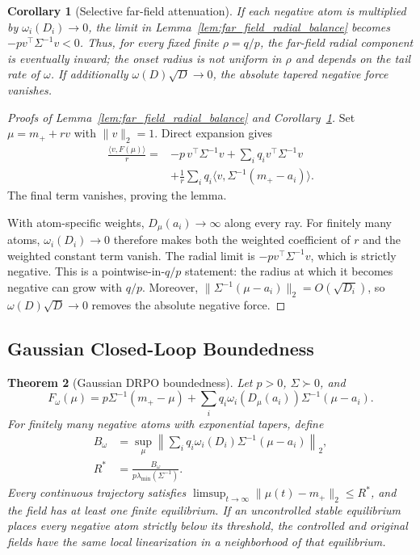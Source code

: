 \documentclass{article}
\theoremstyle{plain}
\newtheorem{theorem}{Theorem}[section]
\newtheorem{corollary}[theorem]{Corollary}
\theoremstyle{definition}
\theoremstyle{remark}
\begin{document}
\begin{corollary}[Selective far-field attenuation]
\label{cor:selective_far_field}
If each negative atom is multiplied by
\(\omega_i(D_i)\to0\), the limit in
Lemma~\ref{lem:far_field_radial_balance} becomes
\(-p v^\top\Sigma^{-1}v<0\).
Thus, for every fixed finite \(\rho=q/p\), the far-field radial component
is eventually inward; the onset radius is not uniform in \(\rho\) and
depends on the tail rate of \(\omega\).
If additionally \(\omega(D)\sqrt D\to0\), the absolute tapered negative
force vanishes.
\end{corollary}

\begin{proof}[Proofs of Lemma~\ref{lem:far_field_radial_balance} and
Corollary~\ref{cor:selective_far_field}]
Set \(\mu=m_++rv\) with \(\|v\|_2=1\). Direct expansion gives
\begin{align}
\frac{\langle v,F(\mu)\rangle}{r}
={}&-p\,v^\top\Sigma^{-1}v
+\sum_iq_i v^\top\Sigma^{-1}v \\
&+\frac1r\sum_iq_i
\langle v,\Sigma^{-1}(m_+-a_i)\rangle.
\end{align}
The final term vanishes, proving the lemma.

With atom-specific weights, \(D_\mu(a_i)\to\infty\) along every ray.
For finitely many atoms, \(\omega_i(D_i)\to0\) therefore makes both the
weighted coefficient of \(r\) and the weighted constant term vanish.
The radial limit is
\(-p v^\top\Sigma^{-1}v\), which is strictly negative. This is a
pointwise-in-\(q/p\) statement: the radius at which it becomes negative
can grow with \(q/p\). Moreover,
\(\|\Sigma^{-1}(\mu-a_i)\|_2=O(\sqrt{D_i})\), so
\(\omega(D)\sqrt D\to0\) removes the absolute negative force.
\end{proof}

\subsection{Gaussian Closed-Loop Boundedness}
\label{app:gaussian_drpo_boundedness}

\begin{theorem}[Gaussian DRPO boundedness]
\label{thm:gaussian_drpo_boundedness}
Let \(p>0\), \(\Sigma\succ0\), and
\[
F_\omega(\mu)=p\Sigma^{-1}(m_+-\mu)
+\sum_iq_i\omega_i(D_\mu(a_i))\Sigma^{-1}(\mu-a_i).
\]
For finitely many negative atoms with exponential tapers, define
\begin{equation}
\begin{aligned}
B_\omega&=\sup_\mu\left\|\sum_iq_i\omega_i(D_i)
\Sigma^{-1}(\mu-a_i)\right\|_2,\\
R^*&=\frac{B_\omega}{p\lambda_{\min}(\Sigma^{-1})}.
\end{aligned}
\label{eq:gaussian_bound_radius}
\end{equation}
Every continuous trajectory satisfies
\(\limsup_{t\to\infty}\|\mu(t)-m_+\|_2\le R^*\), and the field has at
least one finite equilibrium. If an uncontrolled stable equilibrium
places every negative atom strictly below its threshold, the controlled
and original fields have the same local linearization in a neighborhood of
that equilibrium.
\end{theorem}
\end{document}
